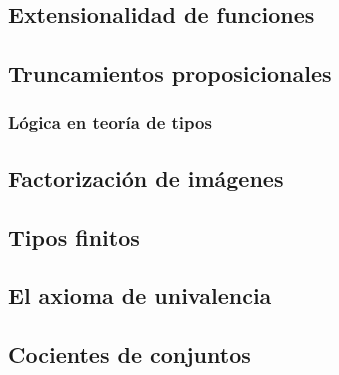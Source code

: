 \documentclass{article}
\begin{document}
\subsection{Extensionalidad de funciones}
\subsection{Truncamientos proposicionales}
\subsubsection{Lógica en teoría de tipos}
\subsection{Factorización de imágenes}
\subsection{Tipos finitos}
\subsection{El axioma de univalencia}
\subsection{Cocientes de conjuntos}



\end{document}
